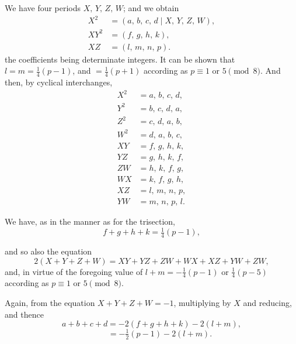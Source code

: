 \documentclass[11pt]{article}
\begin{document}
\noindent
We have four periods $X,\,Y,\,Z,\,W$; and we obtain
\begin{align*}
X^2 &= (a,\,b,\,c,\,d \mid X,\,Y,\,Z,\,W),\\
XY^2 &= (f,\,g,\,h,\,k),\\
XZ &= (l,\,m,\,n,\,p).
\end{align*}
the coefficients being determinate integers. It can be shown that $l = m = \tfrac{1}{4}(p - 1)$, and $= \tfrac{1}{4}(p + 1)$ according as $p \equiv 1$ or $5 \pmod 8$. And then, by cyclical interchanges,
\begin{align*}
X^2 &= a,\,b,\,c,\,d,\\
Y^2 &= b,\,c,\,d,\,a,\\
Z^2 &= c,\,d,\,a,\,b,\\
W^2 &= d,\,a,\,b,\,c,\\
XY &= f,\,g,\,h,\,k,\\
YZ &= g,\,h,\,k,\,f,\\
ZW &= h,\,k,\,f,\,g,\\
WX &= k,\,f,\,g,\,h,\\
XZ &= l,\,m,\,n,\,p,\\
YW &= m,\,n,\,p,\,l.
\end{align*}

\noindent
We have, as in the manner as for the trisection,
\[
f + g + h + k = \tfrac{1}{4}(p - 1),
\]

\noindent
and so also the equation
\[
2(X + Y + Z + W) = XY + YZ + ZW + WX + XZ + YW + ZW,
\]
and, in virtue of the foregoing value of $l + m = -\tfrac{1}{4}(p - 1)$ or $\tfrac{1}{4}(p - 5)$ according as $p \equiv 1$ or $5 \pmod 8$.

\medskip

\noindent
Again, from the equation $X + Y + Z + W = -1$, multiplying by $X$ and reducing,
and thence
\[
a + b + c + d = -2(f + g + h + k) - 2(l + m),
\]
\[
\qquad = -\tfrac{1}{2}(p - 1) - 2(l + m).
\]

\newpage
\end{document}

